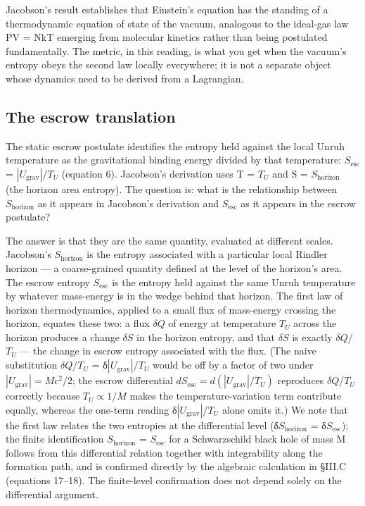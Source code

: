 \documentclass[11pt]{article}
\begin{document}
Jacobson's result establishes that Einstein's equation has the
standing of a thermodynamic equation of state of the vacuum, analogous
to the ideal-gas law PV = NkT emerging from molecular kinetics rather
than being postulated fundamentally. The metric, in this reading, is
what you get when the vacuum's entropy obeys the second law locally
everywhere; it is not a separate object whose dynamics need to be
derived from a Lagrangian.


\subsection{The escrow translation}

The static escrow postulate identifies the entropy held against the
local Unruh temperature as the gravitational binding energy divided by
that temperature: $S_{\mathrm{esc}}$ = $|U_{\mathrm{grav}}|$/$T_{U}$ (equation 6). Jacobson's
derivation uses T = $T_{U}$ and S = $S_{\mathrm{horizon}}$ (the horizon area entropy).
The question is: what is the relationship between $S_{\mathrm{horizon}}$ as it
appears in Jacobson's derivation and $S_{\mathrm{esc}}$ as it appears in the escrow
postulate?

The answer is that they are the same quantity, evaluated at different
scales. Jacobson's $S_{\mathrm{horizon}}$ is the entropy associated with a
particular local Rindler horizon --- a coarse-grained quantity defined
at the level of the horizon's area. The escrow entropy $S_{\mathrm{esc}}$ is the
entropy held against the same Unruh temperature by whatever mass-energy
is in the wedge behind that horizon. The first law of horizon
thermodynamics, applied to a small flux of mass-energy crossing the
horizon, equates these two: a flux $\delta Q$ of energy at temperature $T_{U}$
across the horizon produces a change $\delta S$ in the horizon entropy, and that
$\delta S$ is exactly $\delta Q$/$T_{U}$ --- the change in escrow entropy associated with the flux. (The naive substitution $\delta Q$/$T_{U}$ = δ$|U_{\mathrm{grav}}|$/$T_{U}$ would be off by a factor of two under $|U_{\mathrm{grav}}| = Mc^{2}/2$; the escrow differential $dS_{\mathrm{esc}} = d(|U_{\mathrm{grav}}|/T_{U})$ reproduces $\delta Q$/$T_{U}$ correctly because $T_{U}\propto 1/M$ makes the temperature-variation term contribute equally, whereas the one-term reading δ$|U_{\mathrm{grav}}|$/$T_{U}$ alone omits it.) We note that the first law relates the two
entropies at the differential level (δ$S_{\mathrm{horizon}}$ = δ$S_{\mathrm{esc}}$); the finite
identification $S_{\mathrm{horizon}}$ = $S_{\mathrm{esc}}$ for a Schwarzschild black hole of mass
M follows from this differential relation together with integrability
along the formation path, and is confirmed directly by the algebraic
calculation in §III.C (equations 17--18). The finite-level confirmation
does not depend solely on the differential argument.
\end{document}
